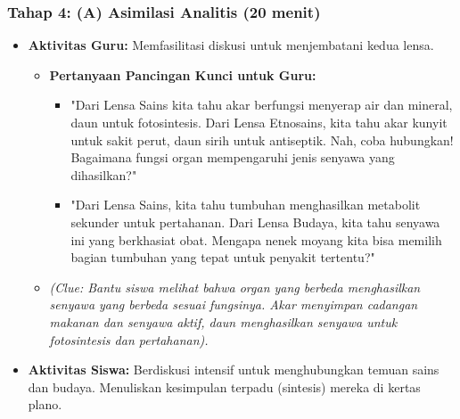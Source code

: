\documentclass[a4paper,12pt]{article}
\begin{document}
\subsubsection{Tahap 4: (A) Asimilasi Analitis (20 menit)}
\begin{itemize}
\item \textbf{Aktivitas Guru:} Memfasilitasi diskusi untuk menjembatani kedua lensa.
    \begin{itemize}
    \item \textbf{Pertanyaan Pancingan Kunci untuk Guru:}
        \begin{itemize}
        \item "Dari Lensa Sains kita tahu akar berfungsi menyerap air dan mineral, daun untuk fotosintesis. Dari Lensa Etnosains, kita tahu akar kunyit untuk sakit perut, daun sirih untuk antiseptik. Nah, coba hubungkan! Bagaimana fungsi organ mempengaruhi jenis senyawa yang dihasilkan?"
        \item "Dari Lensa Sains, kita tahu tumbuhan menghasilkan metabolit sekunder untuk pertahanan. Dari Lensa Budaya, kita tahu senyawa ini yang berkhasiat obat. Mengapa nenek moyang kita bisa memilih bagian tumbuhan yang tepat untuk penyakit tertentu?"
        \end{itemize}
    \item \textit{(Clue: Bantu siswa melihat bahwa organ yang berbeda menghasilkan senyawa yang berbeda sesuai fungsinya. Akar menyimpan cadangan makanan dan senyawa aktif, daun menghasilkan senyawa untuk fotosintesis dan pertahanan).}
    \end{itemize}
\item \textbf{Aktivitas Siswa:} Berdiskusi intensif untuk menghubungkan temuan sains dan budaya. Menuliskan kesimpulan terpadu (sintesis) mereka di kertas plano.
\end{itemize}
\end{document}

